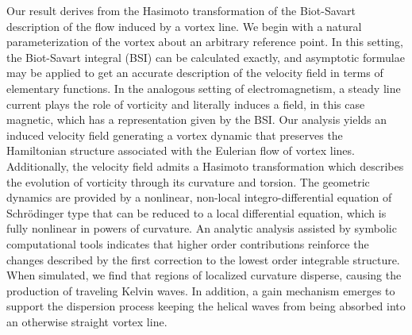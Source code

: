 \documentclass[aps,graphicx,reprint,onecolumn,12pt,tightenlines,longbibliography]{revtex4-1}
\newcommand{\sas}[2]{{#2}}
\begin{document}
Our result derives from the Hasimoto transformation of the Biot-Savart description of the flow induced by a vortex line. We begin with a natural parameterization of the vortex about an arbitrary reference point. In this setting, the Biot-Savart integral (BSI) can be calculated exactly, and asymptotic formulae may be applied to get an accurate description of the velocity field in terms of elementary functions. \sas{}{In the analogous setting of electromagnetism, a steady line current plays the role of vorticity and literally induces a field, in this case magnetic, which has a representation given by the BSI.} \sas{This}{Our analysis yields an induced velocity field generating a vortex} dynamic \sas{}{that} preserves the Hamiltonian structure associated with the Eulerian flow of vortex lines\sas{}{.} \sas{and a}{Additionally, the velocity field a}dmits a Hasimoto transformation \sas{that}{which} describes \sas{}{the evolution of} vorticity through its curvature and torsion. The geometric dynamics are provided by a nonlinear, non-local integro-differential equation of Schr\"odinger type that can be reduced to a local differential equation, which is fully nonlinear in powers of curvature. An analytic analysis assisted by symbolic computational tools  indicates that \sas{all}{} higher order contributions reinforce the changes described by the first correction to the lowest order integrable structure. When simulated, we find that  regions of localized curvature disperse\sas{}{,} causing the production of traveling Kelvin waves. In addition, a gain mechanism emerges to support the dispersion process keeping the helical waves from being absorbed into \sas{the}{an} otherwise straight \sas{background}{vortex line}. 
\end{document}
